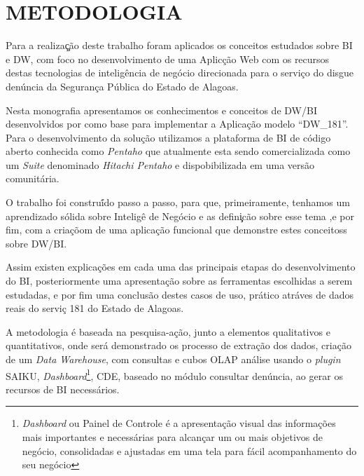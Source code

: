 %
%

\chapter{METODOLOGIA}

Para a realiza\c{c}̧\~{a}o deste trabalho foram aplicados os conceitos estudados sobre BI e DW, com foco no desenvolvimento de uma Aplic\c{c}\~{a}o Web com os recursos destas tecnologias de intelig\^{e}ncia de neg\'{o}cio direcionada para o servi\c{c}o do disgue den\'{u}ncia da Seguran\c{c}a P\'{u}blica do Estado de Alagoas. 

Nesta monografia apresentamos os conhecimentos e conceitos de DW/BI desenvolvidos por \cite{dw-kimball-2013} como base para implementar a Aplicação modelo ``DW\_181''. Para o desenvolvimento da solu\c{c}\~{a}o utilizamos a plataforma de BI de c\'{o}digo aberto conhecida como \textit{Pentaho} que atualmente esta sendo comercializada como um \textit{Suite} denominado \textit{Hitachi Pentaho} e dispobibilizada em uma vers\~{a}o comunit\'{a}ria.

O trabalho foi constru\'{i}́do passo a passo, para que, primeiramente, tenhamos um aprendizado s\'{o}lida sobre Intelig\^{e} de Neg\'{o}cio e as defini\c{̧c}\~{a}o sobre esse tema ,e por fim, com a cria\c{c}\~{o}om de uma aplicação funcional que demonstre estes conceitoss sobre DW/BI.

Assim existen explica\c{c}\~{o}es em cada uma das principais etapas do desenvolvimento do BI, posteriormente uma apresenta\c{c}\~{a}o sobre as ferramentas escolhidas a serem estudadas, e por fim uma conclusão destes casos de uso, pr\'{a}tico atr\'{a}ves de dados reais do servi\c{c} 181 do Estado de Alagoas.

A metodologia \'{e} baseada na pesquisa-a\c{c}\~{a}o, junto a elementos qualitativos e quantitativos, onde ser\'{a} demonstrado os processo de extra\c{c}\~{a}o dos dados,  cria\c{c}\~{a}o de um \textit{Data Warehouse}, com consultas e cubos OLAP an\'{a}lise usando o \textit{plugin} SAIKU, \textit{Dashboard}\footnote{\textit{Dashboard} ou Painel de Controle \'{e} a apresenta\c{c}\~{a}o visual das informa\c{c}ões mais importantes e necess\'{a}rias para alcan\c{c}ar um ou mais objetivos de negócio, consolidadas e ajustadas em uma tela para f\'{a}cil acompanhamento do seu negócio}, CDE, baseado no m\'{o}dulo consultar den\'{u}ncia, ao gerar os recursos de BI necess\'{a}rios.